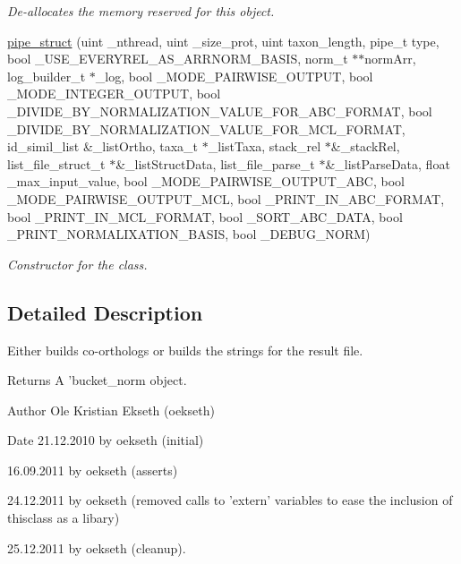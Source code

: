 \begin{DoxyCompactItemize}
\begin{DoxyCompactList}\small\item\em De-\/allocates the memory reserved for this object. \end{DoxyCompactList}\item 
\hyperlink{classpipe__struct_aac0130667428da2ba6042e6ff4a34961}{pipe\_\-struct} (uint \_\-nthread, uint \_\-size\_\-prot, uint taxon\_\-length, pipe\_\-t type, bool \_\-USE\_\-EVERYREL\_\-AS\_\-ARRNORM\_\-BASIS, norm\_\-t $\ast$$\ast$normArr, log\_\-builder\_\-t $\ast$\_\-log, bool \_\-MODE\_\-PAIRWISE\_\-OUTPUT, bool \_\-MODE\_\-INTEGER\_\-OUTPUT, bool \_\-DIVIDE\_\-BY\_\-NORMALIZATION\_\-VALUE\_\-FOR\_\-ABC\_\-FORMAT, bool \_\-DIVIDE\_\-BY\_\-NORMALIZATION\_\-VALUE\_\-FOR\_\-MCL\_\-FORMAT, id\_\-simil\_\-list \&\_\-listOrtho, taxa\_\-t $\ast$\_\-listTaxa, stack\_\-rel $\ast$\&\_\-stackRel, list\_\-file\_\-struct\_\-t $\ast$\&\_\-listStructData, list\_\-file\_\-parse\_\-t $\ast$\&\_\-listParseData, float \_\-max\_\-input\_\-value, bool \_\-MODE\_\-PAIRWISE\_\-OUTPUT\_\-ABC, bool \_\-MODE\_\-PAIRWISE\_\-OUTPUT\_\-MCL, bool \_\-PRINT\_\-IN\_\-ABC\_\-FORMAT, bool \_\-PRINT\_\-IN\_\-MCL\_\-FORMAT, bool \_\-SORT\_\-ABC\_\-DATA, bool \_\-PRINT\_\-NORMALIXATION\_\-BASIS, bool \_\-DEBUG\_\-NORM)
\begin{DoxyCompactList}\small\item\em Constructor for the class. \end{DoxyCompactList}\end{DoxyCompactItemize}


\subsection{Detailed Description}
Either builds co-\/orthologs or builds the strings for the result file. 

\begin{DoxyReturn}{Returns}
A 'bucket\_\-norm object. 
\end{DoxyReturn}
\begin{DoxyAuthor}{Author}
Ole Kristian Ekseth (oekseth) 
\end{DoxyAuthor}
\begin{DoxyDate}{Date}
21.12.2010 by oekseth (initial) 

16.09.2011 by oekseth (asserts) 

24.12.2011 by oekseth (removed calls to 'extern' variables to ease the inclusion of thisclass as a libary) 

25.12.2011 by oekseth (cleanup). 
\end{DoxyDate}


